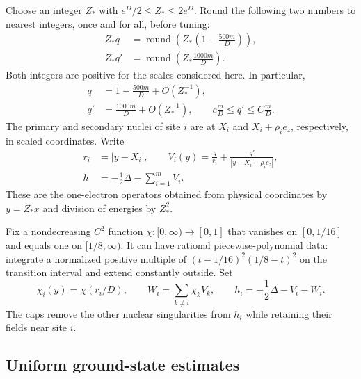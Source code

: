 Choose an integer \(Z_*\) with \(e^D/2\le Z_*\le2e^D\). Round the following
two numbers to nearest integers, once and for all, before tuning:
\begin{equation}
\begin{split}
 Z_*q&=\operatorname{round}\!\left(
              Z_*\left(1-\frac{500m}{D}\right)\right),\\
 Z_*q'&=\operatorname{round}\!\left(Z_*\frac{1000m}{D}\right).
\end{split}
 \label{eq:wells-charges}
\end{equation}
Both integers are positive for the scales considered here. In particular,
\begin{equation}
\begin{split}
 q&=1-\frac{500m}{D}+O(Z_*^{-1}),\\
 q'&=\frac{1000m}{D}+O(Z_*^{-1}),\qquad
 c\frac mD\le q'\le C\frac mD.
\end{split}
 \label{eq:wells-charge-bounds}
\end{equation}
The primary and secondary nuclei of site \(i\) are at \(X_i\) and
\(X_i+\rho_i e_z\), respectively, in scaled coordinates. Write
\begin{equation}
\begin{split}
 r_i&=|y-X_i|,\qquad
 V_i(y)=\frac q{r_i}+\frac{q'}{|y-X_i-\rho_i e_z|},\\
 h&=-\frac12\Delta-\sum_{i=1}^m V_i.
\end{split}
 \label{eq:wells-full-one-body}
\end{equation}
These are the one-electron operators obtained from physical coordinates
by \(y=Z_*x\) and division of energies by \(Z_*^2\).

Fix a nondecreasing \(C^2\) function \(\chi:[0,\infty)\to[0,1]\) that
vanishes on \([0,1/16]\) and equals one on \([1/8,\infty)\). It can have
rational piecewise-polynomial data: integrate a normalized positive
multiple of \((t-1/16)^2(1/8-t)^2\) on the transition interval and extend
constantly outside. Set
\begin{equation}
 \chi_i(y)=\chi(r_i/D),\qquad
 W_i=\sum_{k\ne i}\chi_k V_k,\qquad
 h_i=-\frac12\Delta-V_i-W_i.
 \label{eq:wells-capped}
\end{equation}
The caps remove the other nuclear singularities from \(h_i\) while
retaining their fields near site \(i\).

\subsection{Uniform ground-state estimates}

